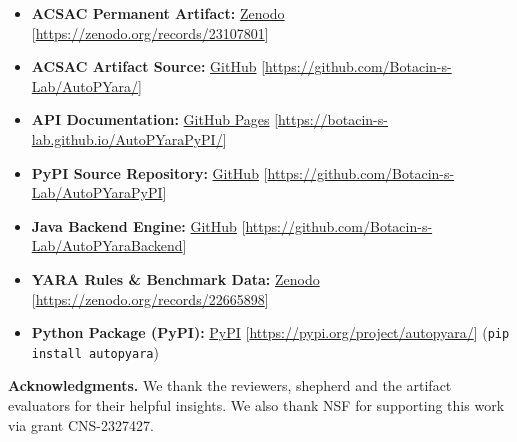 \begin{itemize}
    \item \textbf{ACSAC Permanent Artifact:} \href{https://zenodo.org/records/23107801}{Zenodo} [\url{https://zenodo.org/records/23107801}]
    
    \item \textbf{ACSAC Artifact Source:} \href{https://github.com/Botacin-s-Lab/AutoPYara/}{GitHub} [\url{https://github.com/Botacin-s-Lab/AutoPYara/}]
    
    \item \textbf{API Documentation:} \href{https://botacin-s-lab.github.io/AutoPYaraPyPI/}{GitHub Pages} [\url{https://botacin-s-lab.github.io/AutoPYaraPyPI/}]
        
    \item \textbf{PyPI Source Repository:} \href{https://github.com/Botacin-s-Lab/AutoPYaraPyPI}{GitHub} [\url{https://github.com/Botacin-s-Lab/AutoPYaraPyPI}]
   
    \item \textbf{Java Backend Engine:} \href{https://github.com/Botacin-s-Lab/AutoPYaraBackend}{GitHub} [\url{https://github.com/Botacin-s-Lab/AutoPYaraBackend}]
    
    \item \textbf{YARA Rules \& Benchmark Data:} \href{https://zenodo.org/records/22665898}{Zenodo} [\url{https://zenodo.org/records/22665898}]
    
    \item \textbf{Python Package (PyPI):} \href{https://pypi.org/project/autopyara/}{PyPI} [\url{https://pypi.org/project/autopyara/}] (\texttt{pip install autopyara})
   

\end{itemize}
\noindent \textbf{Acknowledgments.} 
We thank the reviewers, shepherd and the artifact evaluators for their helpful insights. We also thank NSF for supporting this work via grant CNS-2327427.



